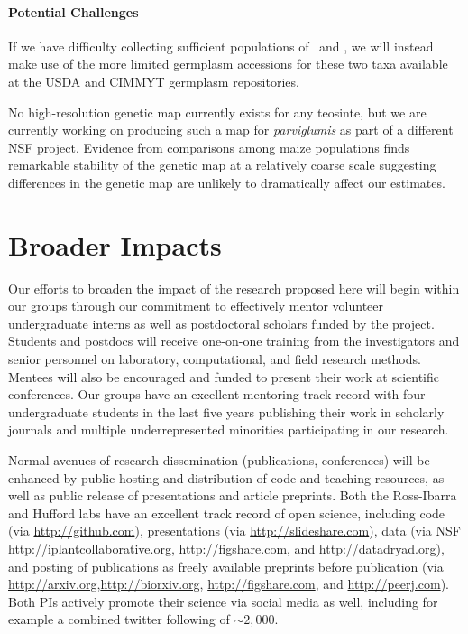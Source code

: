 \paragraph{Potential Challenges} 
If we have difficulty collecting sufficient populations of \zl\ and \zh, we will instead make use of the more limited germplasm accessions for these two taxa available at the USDA and CIMMYT germplasm repositories.

No high-resolution genetic map currently exists for any teosinte, but we are currently working on producing such a map for \emph{parviglumis} as part of a different NSF project.
Evidence from comparisons among maize populations finds remarkable stability of the genetic map at a relatively coarse scale \citep{rodgers2015recombination} suggesting differences in the genetic map are unlikely to dramatically affect our estimates. 

\section*{Broader Impacts}
Our efforts to broaden the impact of the research proposed here will begin within our groups through our commitment to effectively mentor volunteer undergraduate interns as well as postdoctoral scholars funded by the project. Students and postdocs will receive one-on-one training from the investigators and senior personnel on laboratory, computational, and field research methods.  Mentees will also be encouraged and funded to present their work at scientific conferences.  Our groups have an excellent mentoring track record with four undergraduate students in the last five years publishing their work in scholarly journals and multiple underrepresented minorities participating in our research.

Normal avenues of research dissemination (publications, conferences) will be enhanced by public hosting and distribution of code and teaching resources, as well as public release of presentations and article preprints. Both the Ross-Ibarra and Hufford labs have an excellent track record of open science, including code (via \url{http://github.com}), presentations (via \url{http://slideshare.com}), data (via NSF \url{http://iplantcollaborative.org}, \url{http://figshare.com}, and \url{http://datadryad.org}), and posting of publications as freely available preprints before publication (via \url{http://arxiv.org},\url{http://biorxiv.org}, \url{http://figshare.com}, and  \url{http://peerj.com}). Both PIs actively promote their science via social media as well, including for example a combined twitter following of $\sim 2,000$.

